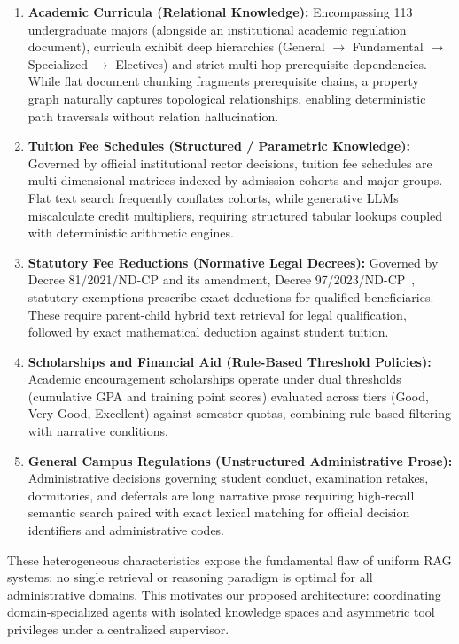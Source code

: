 \begin{enumerate}
    \item \textbf{Academic Curricula (Relational Knowledge):} Encompassing 113 undergraduate majors (alongside an institutional academic regulation document), curricula exhibit deep hierarchies (General $\rightarrow$ Fundamental $\rightarrow$ Specialized $\rightarrow$ Electives) and strict multi-hop prerequisite dependencies. While flat document chunking fragments prerequisite chains, a property graph naturally captures topological relationships, enabling deterministic path traversals without relation hallucination.
    
    \item \textbf{Tuition Fee Schedules (Structured / Parametric Knowledge):} Governed by official institutional rector decisions, tuition fee schedules are multi-dimensional matrices indexed by admission cohorts and major groups. Flat text search frequently conflates cohorts, while generative LLMs miscalculate credit multipliers, requiring structured tabular lookups coupled with deterministic arithmetic engines.
    
    \item \textbf{Statutory Fee Reductions (Normative Legal Decrees):} Governed by Decree 81/2021/ND-CP and its amendment, Decree 97/2023/ND-CP~\cite{government2021decree81,government2023decree97}, statutory exemptions prescribe exact deductions for qualified beneficiaries. These require parent-child hybrid text retrieval for legal qualification, followed by exact mathematical deduction against student tuition.
    
    \item \textbf{Scholarships and Financial Aid (Rule-Based Threshold Policies):} Academic encouragement scholarships operate under dual thresholds (cumulative GPA and training point scores) evaluated across tiers (Good, Very Good, Excellent) against semester quotas, combining rule-based filtering with narrative conditions.
    
    \item \textbf{General Campus Regulations (Unstructured Administrative Prose):} Administrative decisions governing student conduct, examination retakes, dormitories, and deferrals are long narrative prose requiring high-recall semantic search paired with exact lexical matching for official decision identifiers and administrative codes.
\end{enumerate}

These heterogeneous characteristics expose the fundamental flaw of uniform RAG systems: no single retrieval or reasoning paradigm is optimal for all administrative domains. This motivates our proposed architecture: coordinating domain-specialized agents with isolated knowledge spaces and asymmetric tool privileges under a centralized supervisor.

